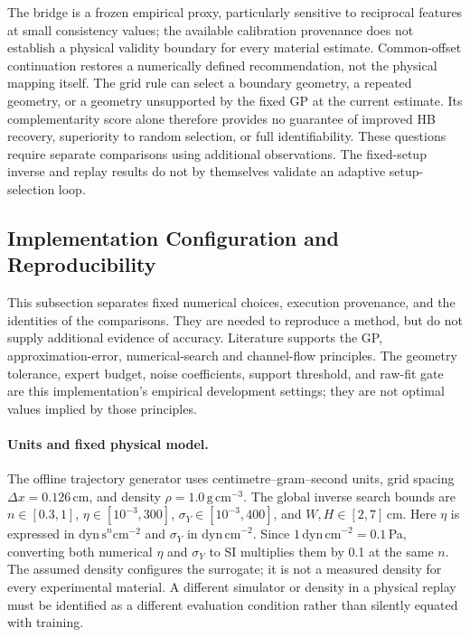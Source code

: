 The bridge is a frozen empirical proxy, particularly sensitive to
reciprocal features at small consistency values; the available
calibration provenance does not establish a physical validity boundary
for every material estimate. Common-offset continuation restores a
numerically defined recommendation, not the physical mapping itself.
The grid rule can select a boundary geometry, a repeated geometry, or
a geometry unsupported by the fixed GP at the current estimate. Its
complementarity score alone therefore provides no guarantee of improved
HB recovery, superiority to random selection, or full identifiability.
These questions require separate comparisons using additional
observations. The fixed-setup inverse and replay results do not by
themselves validate an adaptive setup-selection loop.


\FloatBarrier
\subsection{Implementation Configuration and Reproducibility}
\label{sec:data}

This subsection separates fixed numerical choices, execution provenance,
and the identities of the comparisons. They are needed to reproduce a
method, but do not supply additional evidence of accuracy. Literature
supports the GP, approximation-error, numerical-search and channel-flow
principles. The geometry tolerance, expert budget, noise coefficients,
support threshold, and raw-fit gate are this implementation's empirical
development settings; they are not optimal values implied by those
principles.

\paragraph{Units and fixed physical model.}
The offline trajectory generator uses centimetre--gram--second units,
grid spacing $\Delta x=0.126$\,cm, and density
$\rho=1.0\,\mathrm{g\,cm}^{-3}$. The global inverse search bounds are
$n\in[0.3,1]$, $\eta\in[10^{-3},300]$,
$\sigma_Y\in[10^{-3},400]$, and $W,H\in[2,7]$\,cm.
Here $\eta$ is expressed in $\mathrm{dyn\,s}^{n}\mathrm{cm}^{-2}$
and $\sigma_Y$ in $\mathrm{dyn\,cm}^{-2}$. Since
$1\,\mathrm{dyn\,cm}^{-2}=0.1$\,Pa, converting both numerical
$\eta$ and $\sigma_Y$ to SI multiplies them by 0.1 at the same $n$.
The assumed density configures the surrogate; it is not a measured
density for every experimental material. A different simulator or
density in a physical replay must be identified as a different
evaluation condition rather than silently equated with training.

